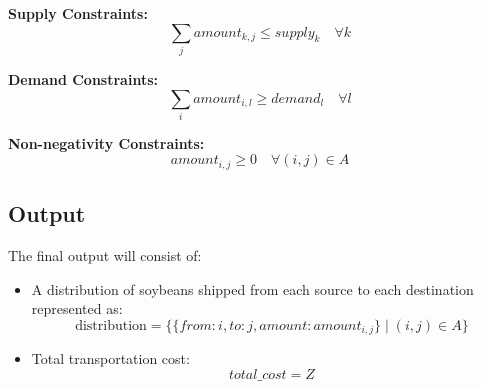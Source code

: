 \documentclass{article}
\begin{document}
\textbf{Supply Constraints:}
\[
\sum_{j} amount_{k,j} \leq supply_k \quad \forall k
\]

\textbf{Demand Constraints:}
\[
\sum_{i} amount_{i,l} \geq demand_l \quad \forall l
\]

\textbf{Non-negativity Constraints:}
\[
amount_{i,j} \geq 0 \quad \forall (i,j) \in A
\]

\subsection*{Output}
The final output will consist of:
\begin{itemize}
    \item A distribution of soybeans shipped from each source to each destination represented as:
    \[
    \text{distribution} = \{ \{from: i, to: j, amount: amount_{i,j}\} \mid (i,j) \in A \}
    \]
    \item Total transportation cost:
    \[
    total\_cost = Z
    \]
\end{itemize}
\end{document}
